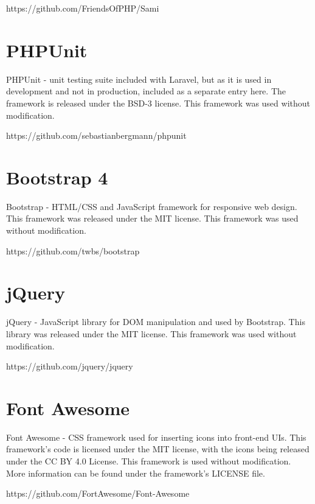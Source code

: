 https://github.com/FriendsOfPHP/Sami

\section{PHPUnit}
PHPUnit - unit testing suite included with Laravel, but as it is used in development and not in production, included as a separate entry here. The framework is released under the BSD-3 license. This framework was used without modification.

https://github.com/sebastianbergmann/phpunit

\section{Bootstrap 4}
Bootstrap - HTML/CSS and JavaScript framework for responsive web design. This framework was released under the MIT license. This framework was used without modification.

https://github.com/twbs/bootstrap

\section{jQuery}

jQuery - JavaScript library for DOM manipulation and used by Bootstrap. This library was released under the MIT license. This framework was used without modification.

https://github.com/jquery/jquery 

\section{Font Awesome}

Font Awesome - CSS framework used for inserting icons into front-end UIs. This framework's code is licensed under the MIT license, with the icons being released under the CC BY 4.0 License. This framework is used without modification. More information can be found under the framework's LICENSE file.

https://github.com/FortAwesome/Font-Awesome